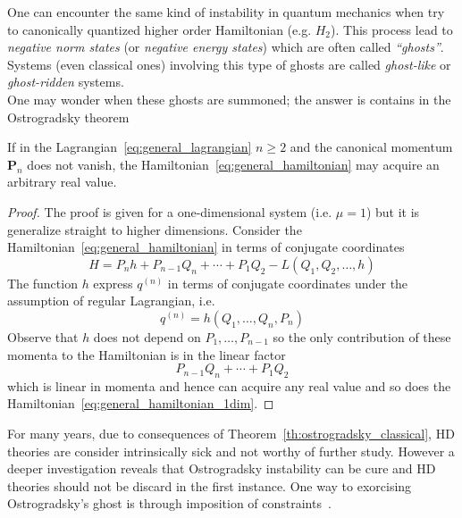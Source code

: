 One can encounter the same kind of instability in quantum mechanics when try to
canonically quantized higher order Hamiltonian (e.g. $H_2$). This process lead
to \emph{negative norm states} (or \emph{negative energy states}) which are
often called \emph{``ghosts''}. Systems (even classical ones) involving this
type of ghosts are called \emph{ghost-like} or \emph{ghost-ridden} systems. \\

One may wonder when these ghosts are summoned; the answer is contains in the
Ostrogradsky theorem

\begin{theorem}[Ostrogradsky]\label{th:ostrogradsky_classical}
  If in the Lagrangian~\eqref{eq:general_lagrangian} $n \geq 2$ and the
  canonical momentum $\bm{P}_n$ does not vanish, the
  Hamiltonian~\eqref{eq:general_hamiltonian} may acquire an arbitrary real
  value.
\end{theorem}
\begin{proof}
  The proof is given for a one-dimensional system (i.e. $\mu=1$) but it is
  generalize straight to higher dimensions. Consider the
  Hamiltonian~\eqref{eq:general_hamiltonian} in terms of conjugate coordinates
  \begin{equation} \label{eq:general_hamiltonian_1dim}
    H = P_n h + P_{n-1} Q_n + \cdots + P_1 Q_2 - L(Q_1, Q_2, \ldots, h)
  \end{equation}
  The function $h$ express $q^{(n)}$ in terms of conjugate coordinates under
  the assumption of regular Lagrangian, i.e.
  \begin{equation*}
    q^{(n)} = h(Q_1, \ldots, Q_n, P_n)
  \end{equation*}
  Observe that $h$ does not depend on $P_1, \ldots, P_{n-1}$ so the only
  contribution of these momenta to the Hamiltonian is in the linear factor
  \begin{equation*}
    P_{n-1} Q_n + \cdots + P_1 Q_2
  \end{equation*}
  which is linear in momenta and hence can acquire any real value and so does
  the Hamiltonian~\eqref{eq:general_hamiltonian_1dim}.
\end{proof}

For many years, due to consequences of Theorem~\ref{th:ostrogradsky_classical},
HD theories are consider intrinsically sick and not worthy of further study.
However a deeper investigation reveals that Ostrogradsky instability can be cure
and HD theories should not be discard in the first instance. One way to
exorcising Ostrogradsky's ghost is through imposition of
constraints~\cite{Chen13}.


